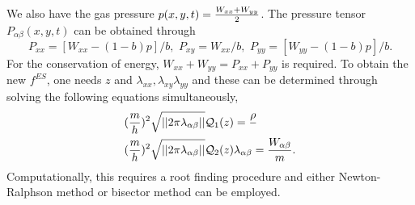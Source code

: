 \documentclass{rsproca}%
\begin{document}
We also have the gas pressure $p(x,y,t) = {W_{xx} + W_{yy} \over 2}$.  The pressure tensor $P_{\alpha \beta}(x,y,t)$ can be obtained through
\begin{equation}
P_{xx} = [W_{xx} - (1-b)p]/b, \,\, P_{xy} = W_{xx}/b, \,\, P_{yy} = [W_{yy} - (1-b)p]/b.
\end{equation}
For the conservation of energy, $W_{xx} +W_{yy} = P_{xx} + P_{yy}$ is required.
To obtain the new $f^{ES}$, one needs $z$ and $\lambda_{xx}, \lambda_{xy}\lambda_{yy}$ and these can be determined through solving the following equations simultaneously,
\begin{align}
&({m \over h})^2 \sqrt{||2 \pi \lambda_{\alpha \beta} ||}\mathcal{Q}_{1}(z) = {\rho \over } \nonumber\\
&({m \over h})^2 \sqrt{||2 \pi \lambda_{\alpha \beta} ||}\mathcal{Q}_{2}(z) \lambda_{\alpha \beta}= {W_{\alpha \beta} \over m}.
\end{align}
Computationally, this requires a root finding procedure and either Newton-Ralphson method or bisector method can be employed.
\end{document}
